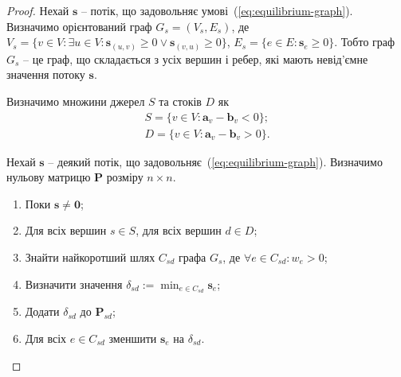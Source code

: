 \begin{proof}
    Нехай $\mathbf{s}$ -- потік, що задовольняє умові~(\ref{eq:equilibrium-graph}). Визначимо орієнтований граф
    $G_s = (V_s, E_s)$, де $V_s = \{v \in V: \exists u \in V: \mathbf{s}_{(u, v)} \ge 0 \lor \mathbf{s}_{(v, u)} \ge 0\}$,
    $E_s = \{e \in E : \mathbf{s}_e \ge 0\}$.
    Тобто граф $G_s$ -- це граф, що складається з усіх вершин і ребер, які мають невід'ємне 
    значення потоку $\mathbf{s}$.

    Визначимо множини джерел $S$ та стоків $D$ як
    \begin{eqnarray*}
        S = \{v \in V: \mathbf{a}_v - \mathbf{b}_v < 0\}; \\ 
        D = \{v \in V: \mathbf{a}_v - \mathbf{b}_v > 0\}.
    \end{eqnarray*}

    Нехай $\mathbf{s}$ -- деякий потік, що задовольняє~(\ref{eq:equilibrium-graph}).
    Визначимо нульову матрицю $\mathbf{P}$ розміру $n \times n$.
    \begin{enumerate}
        \item Поки $\mathbf{s} \neq \mathbf{0}$;
        \item Для всіх вершин $s \in S$, для всіх вершин $d \in D$;
        \item Знайти найкоротший шлях $C_{sd}$ графа $G_s$, де $\forall e \in C_{sd}: w_e > 0$;
        \item Визначити значення $\delta_{sd} := \min_{e \in C_{sd}} \mathbf{s}_e$;
        \item Додати $\delta_{sd}$ до $\mathbf{P}_{sd}$;
        \item Для всіх $e \in C_{sd}$ зменшити $\mathbf{s}_e$ на $\delta_{sd}$.
    \end{enumerate}


\end{proof}
